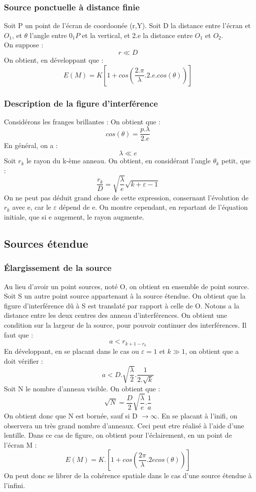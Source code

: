 \subsubsection{Source ponctuelle à distance finie}
Soit P un point de l'écran de coordoonée (r,Y). Soit D la distance entre l'écran et $O_1$, et $\theta$ l'angle entre $0_1P$ et la vertical, et 2.e la distance entre $O_1$ et $O_2$.\\
On suppose : 
$$r \ll D$$
On obtient, en développant que : 
$$E(M) = K[1 + cos(\dfrac{2.\pi}{\lambda}.2.e.cos(\theta))]$$
\subsubsection{Description de la figure d'interférence}
Considérons les franges brillantes : 
On obtient que : 
$$cos(\theta) = \dfrac{p.\lambda}{2.e}$$
En général, on a : 
$$\lambda \ll e$$
Soit $r_k$ le rayon du k-ème anneau. On obtient, en considérant l'angle $\theta_k$ petit, que : 
$$\dfrac{r_k}{D} = \sqrt{\dfrac{\lambda}{e}}\sqrt{k+\varepsilon-1}$$
On ne peut pas déduit grand chose de cette expression, consernant l'évolution de $r_k$ avec e, car le $\varepsilon$ dépend de e. On montre cependant, en repartant de l'équation initiale, que si e augement, le rayon augmente.
\subsection{Sources étendue}
\subsubsection{Élargissement de la source}
Au lieu d'avoir un point sources, noté O, on obtient en ensemble de point source. Soit S un autre point source appartenant à la source étendue. On obtient que la figure d'interférence dû à S est translaté par rapport à celle de O. Notons a la distance entre les deux centres des anneau d'interférences. On obtient une condition sur la largeur de la source, pour pouvoir continuer des interférences. Il faut que : 
$$a < r_{k+1-r_k}$$
En développant, en se placant dans le cas ou $\varepsilon = 1$ et $k \gg 1$, on obtient que a doit vérifier : 
$$a < D.\sqrt{\dfrac{\lambda}{2}}.\dfrac{1}{2.\sqrt{k}}$$
Soit N le nombre d'anneau visible. On obtient que : 
$$\sqrt{N} = \dfrac{D}{2}\sqrt{\dfrac{\lambda}{e}}.\dfrac{1}{a}$$
On obtient donc que N est bornée, sauf si D $\rightarrow \infty$. En se placant à l'inifi, on observera un très grand nombre d'anneaux. Ceci peut etre réalisé à l'aide d'une lentille. Dans ce cas de figure, on obtient pour l'éclairement, en un point de l'écran M : 
$$E(M) = K.[1 + cos(\dfrac{2\pi}{\lambda}.2ecos(\theta))]$$
On peut donc se librer de la cohérence spatiale dans le cas d'une source étendue à l'infini.
